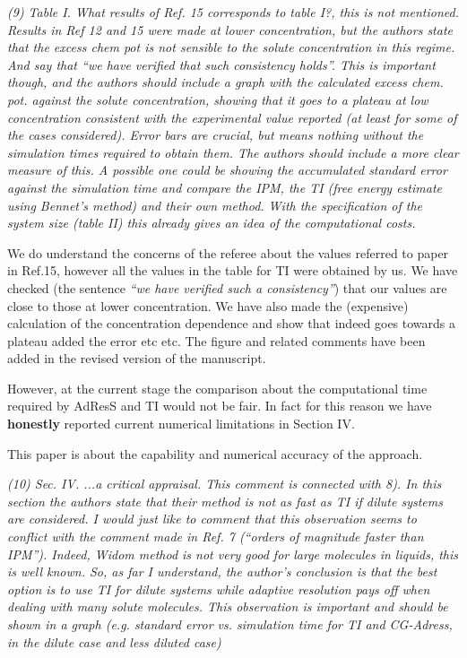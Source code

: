 \documentclass[12pt]{article}
\begin{document}
{\it (9) Table I. What results of Ref. 15 corresponds to table I?,
  this is not mentioned. Results in Ref 12 and 15 were made at lower
  concentration, but the authors state that the excess chem pot is not
  sensible to the solute concentration in this regime. And say that
  ``we have verified that such consistency holds''. This is important
  though, and the authors should include a graph with the calculated
  excess chem. pot. against the solute concentration, showing that it
  goes to a plateau at low concentration consistent with the
  experimental value reported (at least for some of the cases
  considered). Error bars are crucial, but means nothing without the
  simulation times required to obtain them. The authors should include
  a more clear measure of this. A possible one could be showing the
  accumulated standard error against the simulation time and compare
  the IPM, the TI (free energy estimate using Bennet's method) and
  their own method. With the specification of the system size (table
  II) this already gives an idea of the computational costs.}

We do understand the concerns of the referee about the values referred
to paper in Ref.15, however all the values in the table for TI were
obtained by us.  We have checked (the sentence {\it ``we have verified
  such a consistency''}) that our values are close to those at lower
concentration.  We have also made the (expensive) calculation of the
concentration dependence and show that indeed goes towards a plateau
added the error etc etc.  The figure and related comments have been
added in the revised version of the manuscript.

However, at the current stage the comparison about the computational time required by AdResS and TI would not be fair.
In fact for this reason we have {\bf honestly} reported current numerical limitations in Section IV.

This paper is about the capability and numerical accuracy of the approach.

{\it (10) Sec. IV. ...a critical appraisal. This comment is connected with 8). In this section the authors state that their method is not as fast as TI if dilute systems are considered. I would just like to comment that this observation seems to conflict with the comment made in Ref. 7 (``orders of magnitude faster than IPM''). Indeed, Widom method is not very good for large molecules in liquids, this is well known. So, as far I understand, the author's conclusion is that the best option is to use TI for dilute systems while adaptive resolution pays off when dealing with many solute molecules. This observation is important and should be shown in a graph (e.g. standard error vs. simulation time for TI and CG-Adress, in the dilute case and less diluted case)}
\end{document}
